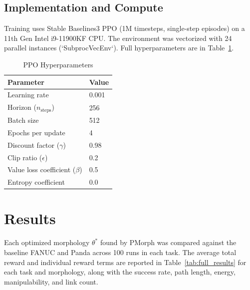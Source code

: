 \documentclass[defaultstyle,11pt]{thesis}
\begin{document}
\section{Implementation and Compute}

Training uses Stable Baselines3 PPO (1M timesteps, single-step episodes) on a 11th Gen Intel i9-11900KF CPU. The environment was vectorized with 24 parallel instances (`SubprocVecEnv`). Full hyperparameters are in Table~\ref{tab:hyperparams}.

\begin{table}[H]
\caption{PPO Hyperparameters}
\label{tab:hyperparams}
\centering
\begin{tabular}{ll}
\hline
\textbf{Parameter} & \textbf{Value} \\
\hline
Learning rate & 0.001 \\
Horizon (\(n_\text{steps}\)) & 256 \\
Batch size & 512 \\
Epochs per update & 4 \\
Discount factor (\(\gamma\)) & 0.98 \\
Clip ratio (\(\epsilon\)) & 0.2 \\
Value loss coefficient (\(\beta\)) & 0.5 \\
Entropy coefficient & 0.0 \\
\hline
\end{tabular}
\end{table}

\chapter{Results}

Each optimized morphology \(\theta^*\) found by PMorph was compared against the baseline FANUC and Panda across 100 runs in each task.
The average total reward and individual reward terms are reported in Table~\ref{tab:full_results} for each task and morphology, along with the success rate, path length, energy, manipulability, and link count.
\end{document}
